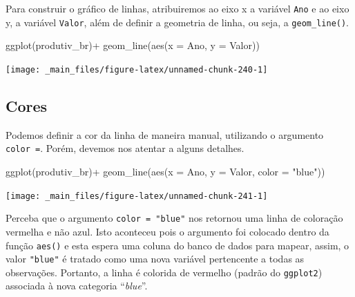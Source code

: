 \documentclass[
  brazilian,
]{book}
\newenvironment{Shaded}{\begin{snugshade}}{\end{snugshade}}
\newcommand{\AttributeTok}[1]{\textcolor[rgb]{0.77,0.63,0.00}{#1}}
\newcommand{\FunctionTok}[1]{\textcolor[rgb]{0.00,0.00,0.00}{#1}}
\newcommand{\NormalTok}[1]{#1}
\newcommand{\SpecialCharTok}[1]{\textcolor[rgb]{0.00,0.00,0.00}{#1}}
\newcommand{\StringTok}[1]{\textcolor[rgb]{0.31,0.60,0.02}{#1}}
\begin{document}
Para construir o gráfico de linhas, atribuiremos ao eixo x a variável \texttt{Ano} e ao eixo y, a variável \texttt{Valor}, além de definir a geometria de linha, ou seja, a \texttt{geom\_line()}.

\begin{Shaded}
\begin{Highlighting}[]
\FunctionTok{ggplot}\NormalTok{(produtiv\_br)}\SpecialCharTok{+}
  \FunctionTok{geom\_line}\NormalTok{(}\FunctionTok{aes}\NormalTok{(}\AttributeTok{x =}\NormalTok{ Ano,}
                \AttributeTok{y =}\NormalTok{ Valor))}
\end{Highlighting}
\end{Shaded}

\begin{center}\texttt{[image: \_main\_files/figure-latex/unnamed-chunk-240-1]} \end{center}

\hypertarget{cores-2}{%
\subsection{Cores}\label{cores-2}}

Podemos definir a cor da linha de maneira manual, utilizando o argumento \texttt{color\ =}. Porém, devemos nos atentar a alguns detalhes.

\begin{Shaded}
\begin{Highlighting}[]
\FunctionTok{ggplot}\NormalTok{(produtiv\_br)}\SpecialCharTok{+}
  \FunctionTok{geom\_line}\NormalTok{(}\FunctionTok{aes}\NormalTok{(}\AttributeTok{x =}\NormalTok{ Ano,}
                \AttributeTok{y =}\NormalTok{ Valor,}
                \AttributeTok{color =} \StringTok{"blue"}\NormalTok{))}
\end{Highlighting}
\end{Shaded}

\begin{center}\texttt{[image: \_main\_files/figure-latex/unnamed-chunk-241-1]} \end{center}

Perceba que o argumento \texttt{color\ =\ "blue"} nos retornou uma linha de coloração vermelha e não azul. Isto aconteceu pois o argumento foi colocado dentro da função \texttt{aes()} e esta espera uma coluna do banco de dados para mapear, assim, o valor \texttt{"blue"} é tratado como uma nova variável pertencente a todas as observações. Portanto, a linha é colorida de vermelho (padrão do \texttt{ggplot2}) associada à nova categoria ``\emph{blue}''.
\end{document}
